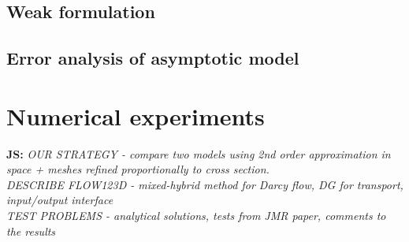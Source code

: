 \documentclass[a4paper]{article}
\newcommand{\note}[2]{{\color{blue} \textbf{ #1:} \textit{#2}}}
\begin{document}
\subsection{Weak formulation}
\subsection{Error analysis of asymptotic model}


\section{Numerical experiments}
\label{sc:numerics}

\note{JS}{
OUR STRATEGY - compare two models using 2nd order approximation in space + meshes refined proportionally to cross section.
\\
DESCRIBE FLOW123D - mixed-hybrid method for Darcy flow, DG for transport, input/output interface
\\
TEST PROBLEMS - analytical solutions, tests from JMR paper, comments to the results
}














%





\end{document}
